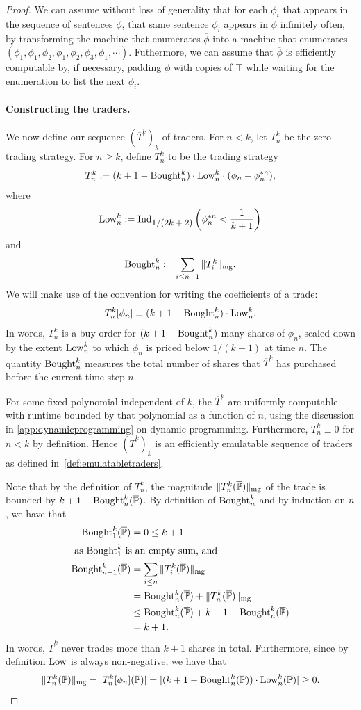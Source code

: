 \documentclass[authordate,onecolumn,noenvironments]{miri-tech-article}
\numberwithin{equation}{subsection}
\newcommand{\seq}[1]{{\overline{#1}}}
\newcommand{\phis}{\seq{\phi}}
\newcommand{\trade}{T}%
\newcommand{\Trader}{\seq{\trade}} %
\newcommand{\magnit}[1]{{\|#1\|_{\rm mg}}} %
\newcommand{\BelState}{\mathbb{P}}
\newcommand{\pt}{\BelState}
\newcommand{\MP}{\seq{\pt}}
\newcommand{\amountbought}{{\rm Bought}}
\newcommand{\lowprice}{{\rm Low}}
\newcommand{\ctsind}[1]{\operatorname{Ind}_{\text{\small{${#1}$}}}} %
\begin{document}
\begin{proof}
We can assume without loss of generality that for each $\phi_i$ that appears in the sequence of sentences $\phis$, that same sentence $\phi_i$ appears in $\phis$
infinitely often, by transforming the machine that enumerates $\phis$ into a machine that enumerates $(\phi_1,\phi_1,\phi_2,
\phi_1,\phi_2,\phi_3,\phi_1,\cdots)$. 
Futhermore,  we can assume that $\phis$ is efficiently computable by, if necessary, padding $\phis$ with copies of $\top$
while waiting for the enumeration to list the next $\phi_i$.

\paragraph{Constructing the traders.}
We now define our sequence  $(\Trader^k)_k$ of traders. For $n<k$,  let $\trade^k_n$ be the zero trading strategy. For $n \ge k$, define $\trade^k_n$ 
to be the trading strategy 
%
\[ \trade^k_n :=  (k + 1 - \amountbought^k_n)  \cdot \lowprice^k_n\cdot  
(\phi_n - \phi_n^{* n}), 
\]
%
where 
%
\[\lowprice^k_n:=  \ctsind{1/(2k + 2)} \left(\phi_n^{* n} < \frac{1}{k+1}\right) \]
%
and
%
\[ \amountbought^k_n := \sum_{i\leq n-1} \magnit{\trade^k_i} .\]
%
We will make use of the convention for writing the coefficients of a trade:
%
\[ \trade^k_n[\phi_n] \equiv  (k + 1 - \amountbought^k_n)  \cdot \lowprice^k_n .
\]
%
In words, $\trade^k_n$ is a buy order for $(k + 1 - \amountbought^k_n)$-many shares of $\phi_n$, scaled down by the extent
$\lowprice^k_n$  to which  $\phi_n$ is priced below  $1/(k+1)$ at time $n$.  The quantity  $\amountbought^k_n$ measures the total number of shares that
$\Trader^k$ has purchased before the current time step $n$.  

For some fixed polynomial independent of $k$,
the $\Trader^k$ are uniformly computable with runtime bounded by that polynomial as a function of $n$,
using the discussion in \ref{app:dynamicprogramming} on dynamic programming. 
Furthermore, $\trade^k_n \equiv 0$ for $n < k$ by definition. Hence $(\Trader^k)_k$ is an
efficiently emulatable sequence of traders as defined in~\ref{def:emulatabletraders}. 

Note that by the definition of $\trade^k_n$, the magnitude $\magnit{\trade^k_n(\MP)}$ of the trade is bounded by $k+1- \amountbought^k_n(\MP)$. 
By definition of   
$\amountbought^k_n$ and by  induction on $n$, we have that 
%
\begin{align*}
\amountbought^k_1 (\MP)& = 0 \leq k+1\\
\shortintertext{ as $ \amountbought^k_1 $ is an empty sum, and}
\amountbought^k_{n +1 }(\MP) &= \sum_{i\leq  n}  \magnit{\trade^k_i (\MP)} \\
  &= \amountbought^k_n (\MP)+  \magnit{\trade^k_n (\MP)}\\ 
&\leq  \amountbought^k_n (\MP)+ k+1- \amountbought^k_n(\MP)\\
&= k+1.
\end{align*}
%
 In words,  $\Trader^k$ never trades more than
$k+1$ shares in total. Furthermore, since by definition $\lowprice$ is always
non-negative, we have that 
%
\[\magnit{\trade^k_n(\MP)} = |\trade^k_n[\phi_n](\MP) | = |(k + 1 - \amountbought^k_n(\MP) )  \cdot \lowprice^k_n(\MP)  | \geq 0. \] 



\end{proof}
\end{document}
